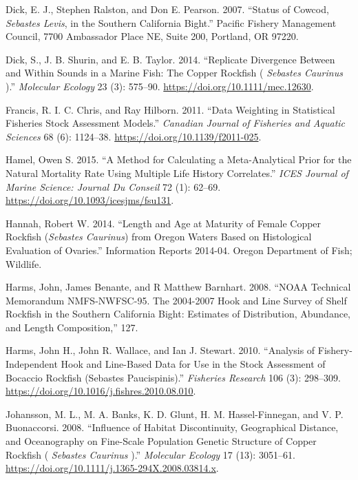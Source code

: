 \documentclass[11pt,
  english,
  a4paper,
]{article}
\begin{document}
\begin{cslreferences}
\leavevmode\hypertarget{ref-dick_status_2007}{}%
Dick, E. J., Stephen Ralston, and Don E. Pearson. 2007. ``Status of Cowcod, \emph{Sebastes Levis}, in the Southern California Bight.'' Pacific Fishery Management Council, 7700 Ambassador Place NE, Suite 200, Portland, OR 97220.

\leavevmode\hypertarget{ref-dick_replicate_2014}{}%
Dick, S., J. B. Shurin, and E. B. Taylor. 2014. ``Replicate Divergence Between and Within Sounds in a Marine Fish: The Copper Rockfish ( \emph{Sebastes Caurinus} ).'' \emph{Molecular Ecology} 23 (3): 575--90. \url{https://doi.org/10.1111/mec.12630}.

\leavevmode\hypertarget{ref-francis_data_2011}{}%
Francis, R. I. C. Chris, and Ray Hilborn. 2011. ``Data Weighting in Statistical Fisheries Stock Assessment Models.'' \emph{Canadian Journal of Fisheries and Aquatic Sciences} 68 (6): 1124--38. \url{https://doi.org/10.1139/f2011-025}.

\leavevmode\hypertarget{ref-hamel_method_2015}{}%
Hamel, Owen S. 2015. ``A Method for Calculating a Meta-Analytical Prior for the Natural Mortality Rate Using Multiple Life History Correlates.'' \emph{ICES Journal of Marine Science: Journal Du Conseil} 72 (1): 62--69. \url{https://doi.org/10.1093/icesjms/fsu131}.

\leavevmode\hypertarget{ref-hannah_length_2014}{}%
Hannah, Robert W. 2014. ``Length and Age at Maturity of Female Copper Rockfish (\emph{Sebastes Caurinus}) from Oregon Waters Based on Histological Evaluation of Ovaries.'' Information Reports 2014-04. Oregon Department of Fish; Wildlife.

\leavevmode\hypertarget{ref-harms_noaa_2008}{}%
Harms, John, James Benante, and R Matthew Barnhart. 2008. ``NOAA Technical Memorandum NMFS-NWFSC-95. The 2004-2007 Hook and Line Survey of Shelf Rockfish in the Southern California Bight: Estimates of Distribution, Abundance, and Length Composition,'' 127.

\leavevmode\hypertarget{ref-harms_analysis_2010}{}%
Harms, John H., John R. Wallace, and Ian J. Stewart. 2010. ``Analysis of Fishery-Independent Hook and Line-Based Data for Use in the Stock Assessment of Bocaccio Rockfish (Sebastes Paucispinis).'' \emph{Fisheries Research} 106 (3): 298--309. \url{https://doi.org/10.1016/j.fishres.2010.08.010}.

\leavevmode\hypertarget{ref-johansson_influence_2008}{}%
Johansson, M. L., M. A. Banks, K. D. Glunt, H. M. Hassel-Finnegan, and V. P. Buonaccorsi. 2008. ``Influence of Habitat Discontinuity, Geographical Distance, and Oceanography on Fine-Scale Population Genetic Structure of Copper Rockfish ( \emph{Sebastes Caurinus} ).'' \emph{Molecular Ecology} 17 (13): 3051--61. \url{https://doi.org/10.1111/j.1365-294X.2008.03814.x}.


\end{cslreferences}
\end{document}
